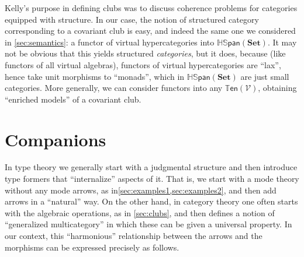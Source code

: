 \documentclass{article}
\theoremstyle{definition}
\theoremstyle{remark}
\def\V{\mathscr{V}}
\def\ten{\mathbb{T}\mathsf{en}}
\def\hspan{\mathbb{HS}\mathsf{pan}}
\def\Set{\mathbf{Set}}
\begin{document}
Kelly's purpose in defining clubs was to discuss coherence problems for categories equipped with structure.
In our case, the notion of structured category corresponding to a covariant club is easy, and indeed the same one we considered in \cref{sec:semantics}: a functor of virtual hypercategories into $\hspan(\Set)$.
It may not be obvious that this yields structured \emph{categories}, but it does, because (like functors of all virtual algebras), functors of virtual hypercategories are ``lax'', hence take unit morphisms to ``monads'', which in $\hspan(\Set)$ are just small categories.
More generally, we can consider functors into any $\ten(\V)$, obtaining ``enriched models'' of a covariant club.


\section{Companions}
\label{sec:companions}

In type theory we generally start with a judgmental structure and then introduce type formers that ``internalize'' aspects of it.
That is, we start with a mode theory without any mode arrows, as in\cref{sec:examples1,sec:examples2}, and then add arrows in a ``natural'' way.
On the other hand, in category theory one often starts with the algebraic operations, as in \cref{sec:clubs}, and then defines a notion of ``generalized multicategory'' in which these can be given a universal property.
In our context, this ``harmonious'' relationship between the arrows and the morphisms can be expressed precisely as follows.
\end{document}
